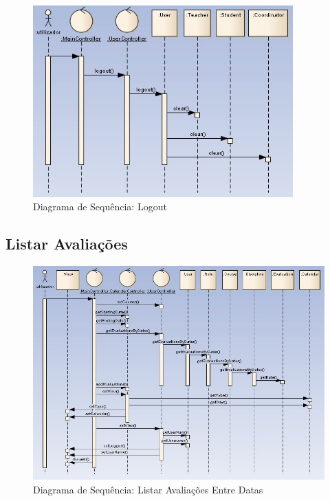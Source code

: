 \begin{figure}[!htbp]
\centering
\includegraphics[width=10cm]{imagens/logout.jpg}
\caption{Diagrama de Sequência: Logout}
\label{fig:logout}
\end{figure}

\clearpage
\subsection{Listar Avaliações}

\begin{figure}[!htbp]
\centering
\includegraphics[width=17cm]{imagens/listar_entre_datas.jpg}
\caption{Diagrama de Sequência: Listar Avaliações Entre Datas}
\label{fig:listar_entre_datas}
\end{figure}

